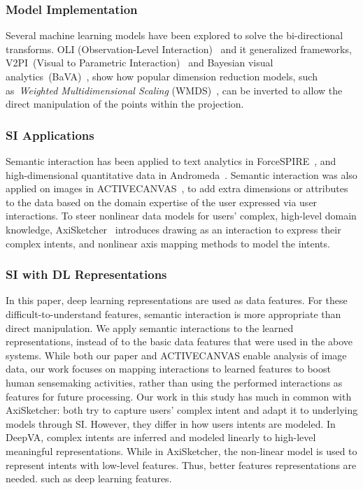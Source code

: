 \documentclass[manuscript,screen]{acmart}
\begin{document}
\subsubsection{Model Implementation}
Several machine learning models have been explored to solve the bi-directional transforms. OLI (Observation-Level Interaction)~\cite{Endert:ji} and it generalized frameworks, 
V2PI~(Visual to Parametric Interaction)~\cite{Leman:2013it} and Bayesian visual analytics~(BaVA)~\cite{house2015bayesian}, show how popular dimension reduction models, such as~\textit{Weighted Multidimensional Scaling} (WMDS)~\cite{schiffman1981introduction}, can be inverted to allow the direct manipulation of the points within the projection.

\subsubsection{SI Applications}
Semantic interaction has been applied to text analytics in ForceSPIRE~\cite{endert2012semantic}, and high-dimensional quantitative data in Andromeda~\cite{Zeitz:2018:BIV:3144687.3144715}. 
Semantic interaction was also applied on images in ACTIVECANVAS~\cite{DBLP:journals/corr/HodasE16}, to add extra dimensions or attributes to the data based on the domain expertise of the user expressed via user interactions.
To steer nonlinear data models for users' complex, high-level domain knowledge, AxiSketcher~\cite{7534876} introduces drawing as an interaction to express their complex intents, and nonlinear axis mapping methods to model the intents.

\subsubsection{SI with DL Representations}
In this paper, deep learning representations are used as data features.
For these difficult-to-understand features, semantic interaction is more appropriate than direct manipulation.
We apply semantic interactions to the learned representations, instead of to the basic data features that were used in the above systems.
While both our paper and ACTIVECANVAS enable analysis of image data, our work focuses on mapping interactions to learned features to boost human sensemaking activities, rather than using the performed interactions as features for future processing.
Our work in this study has much in common with AxiSketcher: both try to capture users' complex intent and adapt it to underlying models through SI.
However, they differ in how users intents are modeled.
In DeepVA, complex intents are inferred and modeled linearly to high-level meaningful representations.
While in AxiSketcher, the non-linear model is used to represent intents with low-level features. 
Thus, better features representations are needed. such as deep learning features. 
\end{document}
